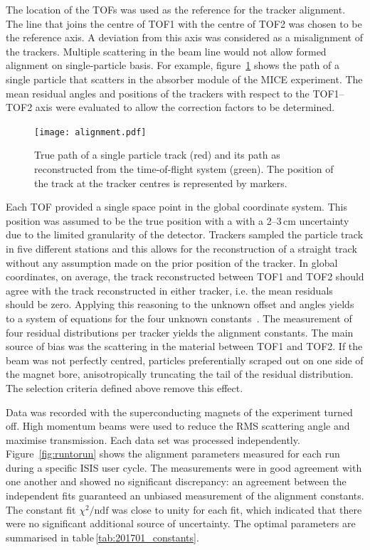 The location of the TOFs was used as the reference for the tracker alignment. The line that joins the centre of TOF1 with the centre of TOF2 was chosen to be the reference axis. A deviation from this axis was considered as a misalignment of the trackers. Multiple scattering in the beam line would not allow formed alignment on single-particle basis. For example, figure~\ref{fig:align_bl} shows the path of a single particle that scatters in the absorber module of the MICE experiment.
 The mean residual angles and positions of the trackers with respect to the TOF1--TOF2 axis were evaluated to allow the correction factors to be determined.

\begin{figure}
	\begin{center}
		\texttt{[image: alignment.pdf]}
	\end{center}
	\caption{
		True path of a single particle track (red) and its path as reconstructed from the time-of-flight system (green). The position of the track at the tracker centres is represented by markers.
	}
	\label{fig:align_bl}
\end{figure}

Each TOF provided a single space point in the global coordinate system. This position was assumed to be the true position with a with a 2--3\,cm uncertainty due to the limited granularity of the detector.
Trackers sampled the particle track in five different stations and this allows for the reconstruction of a straight track without any assumption made on the prior position of the tracker.
In global coordinates, on average, the track reconstructed between TOF1 and TOF2 should agree with the track reconstructed in either tracker, i.e. the mean residuals should be zero. Applying this reasoning to the unknown offset and angles yields to a system of equations for the four unknown constants~\cite{2018arXiv1805.06623T}.
The measurement of four residual distributions per tracker yields the alignment constants.
The main source of bias was the scattering in the material between TOF1 and TOF2. If the beam was not perfectly centred, particles preferentially scraped out on one side of the magnet bore, anisotropically truncating the tail of the residual distribution. The selection criteria defined above remove this effect.

Data was recorded with the superconducting magnets of the experiment turned off. High momentum beams were used to reduce the RMS scattering angle and maximise transmission.  
Each data set was processed independently. Figure~\ref{fig:runtorun} shows the alignment parameters measured for each run during a specific ISIS user cycle. The measurements were in good agreement with one another and showed no significant discrepancy: an agreement between the independent fits guaranteed an unbiased measurement of the alignment constants. The constant fit $\chi^2/\text{ndf}$ was close to unity for each fit, which indicated that there were no significant additional source of uncertainty. The optimal parameters are summarised in table\,\ref{tab:201701_constants}. 


